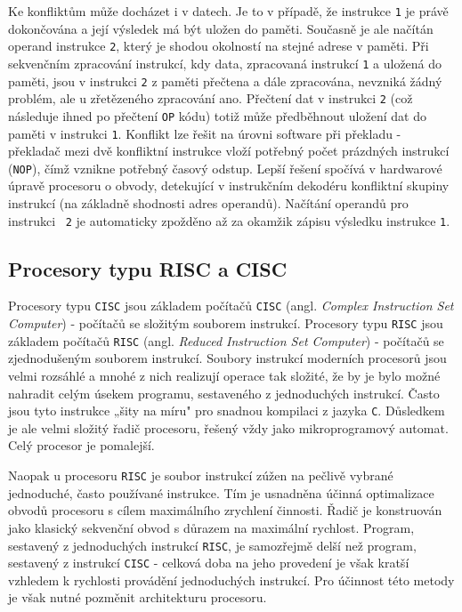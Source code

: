       Ke konfliktům může docházet i v datech. Je to v případě, že instrukce \texttt{1} je právě 
      dokončována a její výsledek má být uložen do paměti. Současně je ale načítán operand 
      instrukce \texttt{2}, který je shodou okolností na stejné adrese v paměti. Při sekvenčním 
      zpracování instrukcí, kdy data, zpracovaná instrukcí \texttt{1} a uložená do paměti, jsou v 
      instrukci \texttt{2} z paměti přečtena a dále zpracována, nevzniká žádný problém, ale u 
      zřetězeného zpracování ano. Přečtení dat v instrukci \texttt{2} (což následuje ihned po 
      přečtení \texttt{OP} kódu) totiž může předběhnout uložení dat do paměti v instrukci 
      \texttt{1}. Konflikt lze řešit na úrovni software při překladu - překladač mezi dvě 
      konfliktní instrukce vloží potřebný počet prázdných instrukcí (\texttt{NOP}), čímž vznikne 
      potřebný časový odstup. Lepší řešení spočívá v hardwarové úpravě procesoru o obvody, 
      detekující v instrukčním dekodéru konfliktní skupiny instrukcí (na základně shodnosti adres 
      operandů). Načítání operandů pro instrukci \ \texttt{2} je automaticky zpožděno až za okamžik 
      zápisu výsledku instrukce \texttt{1}.

    \subsection{Procesory typu RISC a CISC}\label{ces:IchapIVsecIIssecIV}
      Procesory typu \texttt{CISC} jsou základem počítačů \texttt{CISC} (angl. \emph{Complex 
      Instruction Set Computer}) - počítačů se složitým souborem instrukcí. Procesory typu 
      \texttt{RISC} jsou základem počítačů \texttt{RISC} (angl. \emph{Reduced Instruction Set 
      Computer}) - počítačů se zjednodušeným souborem instrukcí. Soubory instrukcí moderních 
      procesorů jsou velmi rozsáhlé a mnohé z nich realizují operace tak složité, že by je bylo 
      možné nahradit celým úsekem programu, sestaveného z jednoduchých instrukcí. Často jsou tyto 
      instrukce „šity na míru" pro snadnou kompilaci z jazyka \texttt{C}. Důsledkem je ale velmi 
      složitý řadič procesoru, řešený vždy jako mikroprogramový automat. Celý procesor 
      je pomalejší.
      
      Naopak u procesoru \texttt{RISC} je soubor instrukcí zúžen na pečlivě vybrané jednoduché, 
      často používané instrukce. Tím je usnadněna účinná optimalizace obvodů procesoru s cílem 
      maximálního zrychlení činnosti. Řadič je konstruován jako klasický sekvenční obvod s důrazem 
      na maximální rychlost. Program, sestavený z jednoduchých instrukcí \texttt{RISC}, je 
      samozřejmě delší než program, sestavený z instrukcí \texttt{CISC} - celková doba na jeho 
      provedení je však kratší vzhledem k rychlosti provádění jednoduchých instrukcí. Pro účinnost 
      této metody je však nutné pozměnit architekturu procesoru.
      
